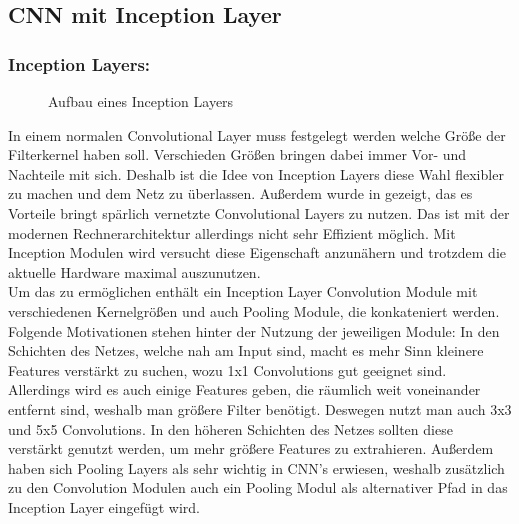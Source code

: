 \documentclass[runningheads,a4paper]{llncs}[2015/06/24]
\begin{document}
\subsection{CNN mit Inception Layer}
\subsubsection*{Inception Layers:}
\begin{figure}
	\caption{Aufbau eines Inception Layers}
	\label{fig:inception_graph}
\end{figure}
In einem normalen Convolutional Layer muss festgelegt werden welche Größe der Filterkernel haben soll. Verschieden Größen bringen dabei immer Vor- und Nachteile mit sich. Deshalb ist die Idee von Inception Layers diese Wahl flexibler zu machen und dem Netz zu überlassen. Außerdem wurde in \cite{sparse_paper} gezeigt, das es Vorteile bringt spärlich vernetzte Convolutional Layers zu nutzen. Das ist mit der modernen Rechnerarchitektur allerdings nicht sehr Effizient möglich. Mit Inception Modulen wird versucht diese Eigenschaft anzunähern und trotzdem die aktuelle Hardware maximal auszunutzen.\\
Um das zu ermöglichen enthält ein Inception Layer Convolution Module mit verschiedenen Kernelgrößen und auch Pooling Module, die konkateniert werden. Folgende Motivationen stehen hinter der Nutzung der jeweiligen Module: In den Schichten des Netzes, welche nah am Input sind, macht es mehr Sinn kleinere Features verstärkt zu suchen, wozu 1x1 Convolutions gut geeignet sind. Allerdings wird es auch einige Features geben, die räumlich weit voneinander entfernt sind, weshalb man größere Filter benötigt. Deswegen nutzt man auch 3x3 und 5x5 Convolutions. In den höheren Schichten des Netzes sollten diese verstärkt genutzt werden, um mehr größere Features zu extrahieren. Außerdem haben sich Pooling Layers als sehr wichtig in CNN's erwiesen, weshalb zusätzlich zu den Convolution Modulen auch ein Pooling Modul als alternativer Pfad in das Inception Layer eingefügt wird.\\
\end{document}
